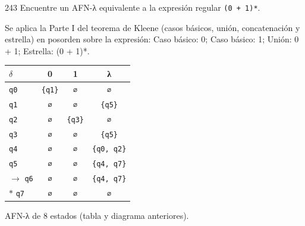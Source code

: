 \documentclass[11pt]{article}
\begin{document}
\begin{ejercicio}{243}{}
Encuentre un AFN-λ equivalente a la expresión regular \texttt{(0 + 1)*}.
\end{ejercicio}
\proc Se aplica la Parte I del teorema de Kleene (casos básicos, unión, concatenación y estrella) en posorden sobre la expresión: Caso básico: 0; Caso básico: 1; Unión: 0 + 1; Estrella: (0 + 1)*.
\begin{center}\small\begin{tabular}{lccc}\toprule
$\delta$ & 0 & 1 & λ \\\midrule
 \texttt{q0} & \texttt{\{q1\}} & \texttt{∅} & \texttt{∅} \\
 \texttt{q1} & \texttt{∅} & \texttt{∅} & \texttt{\{q5\}} \\
 \texttt{q2} & \texttt{∅} & \texttt{\{q3\}} & \texttt{∅} \\
 \texttt{q3} & \texttt{∅} & \texttt{∅} & \texttt{\{q5\}} \\
 \texttt{q4} & \texttt{∅} & \texttt{∅} & \texttt{\{q0, q2\}} \\
 \texttt{q5} & \texttt{∅} & \texttt{∅} & \texttt{\{q4, q7\}} \\
$\to$ \texttt{q6} & \texttt{∅} & \texttt{∅} & \texttt{\{q4, q7\}} \\
$*$ \texttt{q7} & \texttt{∅} & \texttt{∅} & \texttt{∅} \\
\bottomrule\end{tabular}\end{center}

\resp AFN-λ de 8 estados (tabla y diagrama anteriores).
\end{document}
